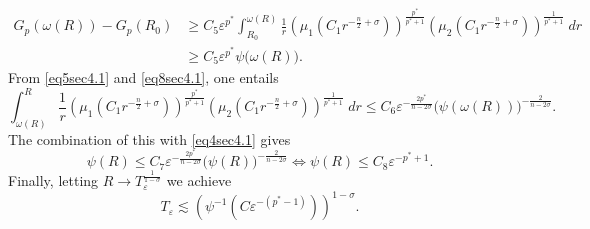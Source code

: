 \documentclass[11pt,reqno]{amsart}
\newcommand{\tron}[1]{\left( #1 \right)}
\numberwithin{equation}{section}
\newcommand{\e}{\varepsilon}
\theoremstyle{plain}
\begin{document}
\begin{itemize}
\begin{equation}\label{eq8sec4.1}
\begin{aligned}
G_{p}(\omega(R))-G_{p}(R_0)&\geq C_5\varepsilon^{p^*}\int_{R_0}^{\omega(R)}\frac{1}{r}\left(\mu_1\left(C_1 r^{-\frac{n}{2}+\sigma}\right)\right)^{\frac{p^*}{p^*+1}}\left(\mu_2\left(C_1 r^{-\frac{n}{2}+\sigma}\right)\right)^{\frac{1}{p^*+1}}\;dr\\
&\geq C_5\varepsilon^{p^*}\psi\big(\omega(R)\big).
\end{aligned}
\end{equation}
From \eqref{eq5sec4.1} and \eqref{eq8sec4.1}, one entails
$$ \int_{\omega(R)}^{R}\frac{1}{r}\left(\mu_1\left(C_1 r^{-\frac{n}{2}+\sigma}\right)\right)^{\frac{p^*}{p^*+1}}\left(\mu_2\left(C_1r^{-\frac{n}{2}+\sigma}\right)\right)^{\frac{1}{p^*+1}}\;dr\leq C_6\e^{-\frac{2p^*}{n-2\sigma}}\big(\psi(\omega(R))\big)^{-\frac{2}{n-2\sigma}}. $$
The combination of this with \eqref{eq4sec4.1} gives
\begin{equation*}
\psi(R)\leq C_7\varepsilon^{-\frac{2p^*}{n-2\sigma}}\big(\psi(R)\big)^{-\frac{2}{n-2\sigma}} \Leftrightarrow \psi(R) \leq C_8\varepsilon^{-p^*+1}.
\end{equation*}
Finally, letting $R\to T_{\varepsilon}^{\frac{1}{1-\sigma}}$ we achieve
\[
T_{\varepsilon}\lesssim \tron{\psi^{-1}\tron{C\varepsilon^{-(p^*-1)}}}^{1-\sigma}.
\]
\end{itemize}
\end{document}
